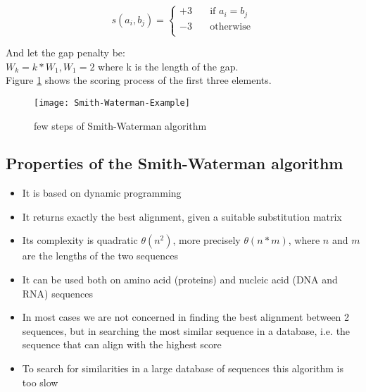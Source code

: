 \[ s(a_i,b_j) =
  \begin{cases}
    +3       & \quad \text{if } a_i = b_j\\
    -3	     & \quad \text{otherwise} \\
  \end{cases}
\]

And let the gap penalty be: \\

$W_k = k*W_1, W_1 = 2$ where k is the length of the gap. \\

Figure \ref{fig:steps} shows the scoring process of the first three elements.

\begin{figure}[H]
  \centering
  \texttt{[image: Smith-Waterman-Example]}
  \caption{few steps of Smith-Waterman algorithm}
  \label{fig:steps}
\end{figure}

\subsection{Properties of the Smith-Waterman algorithm}

\begin{itemize}
  \item It is based on dynamic programming
  \item It returns exactly the best alignment, given a suitable substitution
 matrix
  \item Its complexity is quadratic $\theta(n^2)$, more precisely
$\theta(n*m)$, where $n$ and $m$ are the lengths of the two sequences
  \item It can be used both on amino acid (proteins) and nucleic acid (DNA and
RNA) sequences
  \item In most cases we are not concerned in finding the best alignment
between 2 sequences, but in searching the most similar sequence in a database,
i.e. the sequence that can align with the highest score
  \item To search for similarities in a large database of sequences this
algorithm is too slow
\end{itemize}
